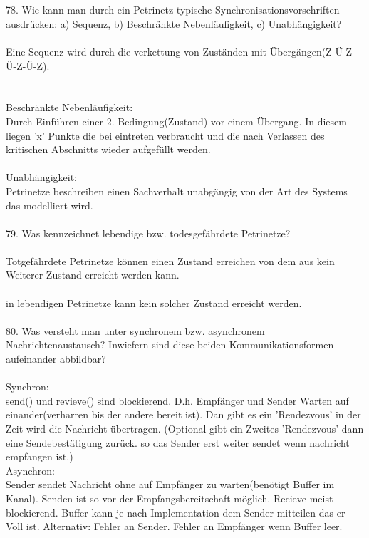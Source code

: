 \documentclass{article}
\newcommand\tab[1][1cm]{\hspace*{#1}}
\begin{document}
\\
\\
78. Wie kann man durch ein Petrinetz typische Synchronisationsvorschriften ausdrücken:
a) Sequenz,
b) Beschränkte Nebenläufigkeit,
c) Unabhängigkeit?
\\
\\
Eine Sequenz wird durch die verkettung von Zust\"anden mit \"Uberg\"angen(Z-\"U-Z-\"U-Z-\"U-Z).\\
\\
\\
Beschr\"ankte Nebenl\"aufigkeit:\\
Durch Einf\"uhren einer 2. Bedingung(Zustand) vor einem \"Ubergang. In diesem liegen 'x' Punkte die bei eintreten verbraucht und die nach Verlassen des kritischen Abschnitts wieder aufgef\"ullt werden.
\\
\\
Unabh\"angigkeit:\\
Petrinetze beschreiben einen Sachverhalt unabg\"angig von der Art des Systems das modelliert wird.
\\
\\
79. Was kennzeichnet lebendige bzw. todesgefährdete Petrinetze?
\\
\\
Totgef\"ahrdete Petrinetze k\"onnen einen Zustand erreichen von dem aus kein Weiterer Zustand erreicht werden kann.
\\
\\
in lebendigen Petrinetze kann kein solcher Zustand erreicht werden.
\\
\\
80. Was versteht man unter synchronem bzw. asynchronem Nachrichtenaustausch? Inwiefern
sind diese beiden Kommunikationsformen aufeinander abbildbar?
\\
\\
Synchron:\\
\tab send() und revieve() sind blockierend. D.h. Empf\"anger und Sender Warten auf einander(verharren bis der andere bereit ist). Dan gibt es ein 'Rendezvous' in der Zeit wird die Nachricht \"ubertragen. (Optional gibt ein Zweites 'Rendezvous' dann eine Sendebest\"atigung zur\"uck. so das Sender erst weiter sendet wenn nachricht empfangen ist.)\\
Asynchron:\\
\tab Sender sendet Nachricht ohne auf Empf\"anger zu warten(ben\"otigt Buffer im Kanal). Senden ist so vor der Empfangsbereitschaft m\"oglich. Recieve meist blockierend.
Buffer kann je nach Implementation dem Sender mitteilen das er Voll ist. Alternativ: Fehler an Sender. Fehler an Empf\"anger wenn Buffer leer.\\
\end{document}
